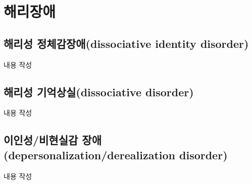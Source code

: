 \section{해리장애}

\subsection{해리성 정체감장애(dissociative identity disorder)}
내용 작성

\subsection{해리성 기억상실(dissociative disorder)}
내용 작성

\subsection{이인성/비현실감 장애(depersonalization/derealization disorder)}
내용 작성
